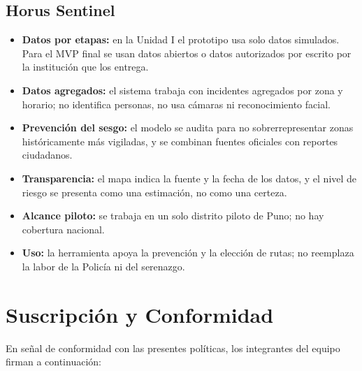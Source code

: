 \documentclass[11pt,a4paper]{article}
\begin{document}
\subsection{Horus Sentinel}
\begin{itemize}[leftmargin=*]
    \item \textbf{Datos por etapas:} en la Unidad I el prototipo usa solo datos simulados. Para el MVP final se usan datos abiertos o datos autorizados por escrito por la institución que los entrega.
    \item \textbf{Datos agregados:} el sistema trabaja con incidentes agregados por zona y horario; no identifica personas, no usa cámaras ni reconocimiento facial.
    \item \textbf{Prevención del sesgo:} el modelo se audita para no sobrerrepresentar zonas históricamente más vigiladas, y se combinan fuentes oficiales con reportes ciudadanos.
    \item \textbf{Transparencia:} el mapa indica la fuente y la fecha de los datos, y el nivel de riesgo se presenta como una estimación, no como una certeza.
    \item \textbf{Alcance piloto:} se trabaja en un solo distrito piloto de Puno; no hay cobertura nacional.
    \item \textbf{Uso:} la herramienta apoya la prevención y la elección de rutas; no reemplaza la labor de la Policía ni del serenazgo.
\end{itemize}

\section{Suscripción y Conformidad}
\noindent En señal de conformidad con las presentes políticas, los integrantes del equipo firman a continuación:

\vspace{1.6cm}
\end{document}
